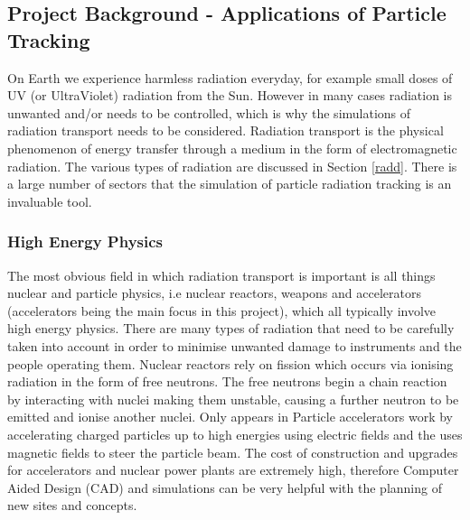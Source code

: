 \documentclass[12pt,a4paper]{article}
\begin{document}
\subsection{Project Background - Applications of Particle Tracking}
\label{back}
On Earth we experience harmless radiation everyday, for example small doses of UV (or UltraViolet) radiation from the Sun. However in many cases radiation is unwanted and/or needs to be controlled, which is why the simulations of radiation transport needs to be considered. Radiation transport is the physical phenomenon of energy transfer through a medium in the form of electromagnetic radiation. The various types of radiation are discussed in Section \ref{radd}. There is a large number of sectors that the simulation of particle radiation tracking is an invaluable tool.

\subsubsection{High Energy Physics}
\noindent The most obvious field in which radiation transport is important is all things nuclear and particle physics, i.e nuclear reactors, weapons and accelerators (accelerators being the main focus in this project), which all typically involve high energy physics. There are many types of radiation that need to be carefully taken into account in order to minimise unwanted damage to instruments and the people operating them. Nuclear reactors rely on fission which occurs via ionising radiation in the form of free neutrons. The free neutrons begin a chain reaction by interacting with nuclei making them unstable, causing a further neutron to be emitted and ionise another nuclei. Only appears in Particle accelerators work by accelerating charged particles up to high energies using electric fields and the uses magnetic fields to steer the particle beam. The cost of construction and upgrades for accelerators and nuclear power plants are extremely high, therefore  Computer Aided Design (CAD) and simulations can be very helpful with the planning of new sites and concepts. 
\end{document}

